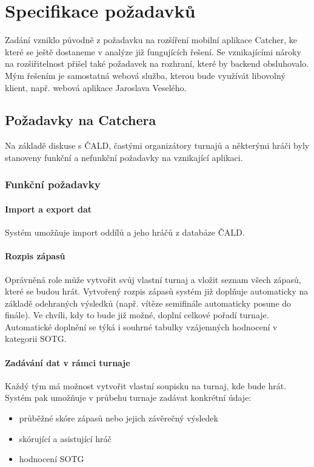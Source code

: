 \chapter{Specifikace požadavků}

\indent

Zadání vzniklo původně z požadavku na rozšíření mobilní aplikace Catcher, ke které se ještě
dostaneme v analýze již fungujících řešení. Se vznikajícími nároky na rozšiřitelnost přišel
také požadavek na rozhraní, které by backend obsluhovalo. Mým řešením je samostatná webová
služba, kterou bude využívát libovolný klient, např. webová aplikace Jaroslava Veselého. 

\section{Požadavky na Catchera}

\indent

Na základě diskuse s ČALD, častými organizátory turnajů a některými hráči byly stanoveny
funkční a nefunkční požadavky na vznikající aplikaci.

\subsection{Funkční požadavky}

\subsubsection*{Import a export dat}
Systém umožňuje import oddílů a jeho hráčů z databáze ČALD.

\subsubsection*{Rozpis zápasů}
Oprávněná role může vytvořit svůj vlastní turnaj a vložit seznam všech zápasů,
které se budou hrát. Vytvořený rozpis zápasů systém již doplňuje automaticky na základě
odehraných výsledků (např. vítěze semifinále automaticky posune do finále). Ve chvíli,
kdy to bude již možné, doplní celkové pořadí turnaje. Automatické doplnění se týká i 
souhrné tabulky vzájemných hodnocení v kategorii SOTG.

\subsubsection*{Zadávání dat v rámci turnaje}
Každý tým má možnost vytvořit vlastní soupisku na turnaj, kde bude hrát. Systém pak umožňuje
v průbehu turnaje zadávat konkrétní údaje:
\begin{itemize}
  \item průběžné skóre zápasů nebo jejich závěrečný výsledek
  \item skórující a asistující hráč
  \item hodnocení SOTG
\end{itemize}

